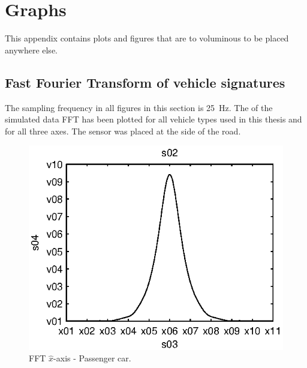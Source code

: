\cleardoublepage\chapter{Graphs}\label{chap:plots}
This appendix contains plots and figures that are to voluminous to be placed anywhere else.

\section{Fast Fourier Transform of vehicle signatures}
The sampling frequency in all figures in this section is 25~Hz. The of the simulated data FFT has been plotted for all vehicle types used in this thesis and for all three axes. The sensor was placed at the side of the road.

\begin{subfigures}
\begin{figure}[tfhb]
 \centering
 \begin{minipage}{0.45\linewidth}
 	\centering
 	
	\includegraphics[width=1\linewidth]{images/fft-car-x}
  	\caption[FFT $\hat{x}$-axis - Passenger car]{FFT $\hat{x}$-axis - Passenger car.\\}
  	\label{fig:fft-car-x} 
 \end{minipage} \hfill
 \begin{minipage}{0.45\linewidth}
 	\centering
  	

\end{minipage}
\end{figure}
\end{subfigures}
